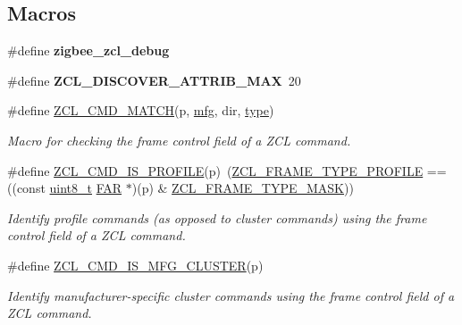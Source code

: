 \subsection*{Macros}
\begin{DoxyCompactItemize}
\item 
\hypertarget{group__zcl_ga1d1ebe413ff0242049bed47dc8ffefe9}{\#define {\bfseries zigbee\-\_\-zcl\-\_\-debug}}\label{group__zcl_ga1d1ebe413ff0242049bed47dc8ffefe9}

\item 
\hypertarget{group__zcl_ga0b1185c5098f4fa736010b594ab2b71f}{\#define {\bfseries Z\-C\-L\-\_\-\-D\-I\-S\-C\-O\-V\-E\-R\-\_\-\-A\-T\-T\-R\-I\-B\-\_\-\-M\-A\-X}~20}\label{group__zcl_ga0b1185c5098f4fa736010b594ab2b71f}

\item 
\#define \hyperlink{group__zcl_ga0bbd651dae138e104715e6e2de62084e}{Z\-C\-L\-\_\-\-C\-M\-D\-\_\-\-M\-A\-T\-C\-H}(p, \hyperlink{group__zcl_gacef7f7e36d411b8000d1ac172c5e8782}{mfg}, dir, \hyperlink{group__zcl_ga1d127017fb298b889f4ba24752d08b8e}{type})
\begin{DoxyCompactList}\small\item\em Macro for checking the frame control field of a Z\-C\-L command. \end{DoxyCompactList}\item 
\#define \hyperlink{group__zcl_gaafcfd290eea997dae1be3d22aa106264}{Z\-C\-L\-\_\-\-C\-M\-D\-\_\-\-I\-S\-\_\-\-P\-R\-O\-F\-I\-L\-E}(p)~(\hyperlink{group__zcl_ga332a452ea08eb67a3ebf962320bf8819}{Z\-C\-L\-\_\-\-F\-R\-A\-M\-E\-\_\-\-T\-Y\-P\-E\-\_\-\-P\-R\-O\-F\-I\-L\-E} == ((const \hyperlink{group__hal_gae1affc9ca37cfb624959c866a73f83c2}{uint8\-\_\-t} \hyperlink{group__hal_gaef060b3456fdcc093a7210a762d5f2ed}{F\-A\-R} $\ast$)(p) \& \hyperlink{group__zcl_gad2e6a61d29cd303e906699a49fa2eb8e}{Z\-C\-L\-\_\-\-F\-R\-A\-M\-E\-\_\-\-T\-Y\-P\-E\-\_\-\-M\-A\-S\-K}))
\begin{DoxyCompactList}\small\item\em Identify profile commands (as opposed to cluster commands) using the frame control field of a Z\-C\-L command. \end{DoxyCompactList}\item 
\#define \hyperlink{group__zcl_gaaef303ea4f7fa9a8beeace9ce3a1f9fd}{Z\-C\-L\-\_\-\-C\-M\-D\-\_\-\-I\-S\-\_\-\-M\-F\-G\-\_\-\-C\-L\-U\-S\-T\-E\-R}(p)
\begin{DoxyCompactList}\small\item\em Identify manufacturer-\/specific cluster commands using the frame control field of a Z\-C\-L command. \end{DoxyCompactList}\item 

\end{DoxyCompactItemize}
